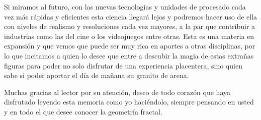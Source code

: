 Si miramos al futuro, con las nuevas tecnologías y unidades de procesado cada vez más rápidas y eficientes esta ciencia llegará lejos y podremos hacer uso de ella con niveles de realismo y resoluciones cada vez mayores, a la par que contribuir a industrias como las del cine o los videojuegos entre otras. Esta es una materia en expansión y que vemos que puede ser muy rica en aportes a otras disciplinas, por lo que incitamos a quien lo desee que entre a descubir la magia de estas extrañas figuras para poder no solo disfrutar de una experiencia placentera, sino quien sabe si poder aportar el día de mañana su granito de arena.

Muchas gracias al lector por su atención, deseo de todo corazón que haya disfrutado leyendo esta memoria como yo haciéndolo, siempre pensando en usted y en todo el que desee conocer la geometría fractal. 

